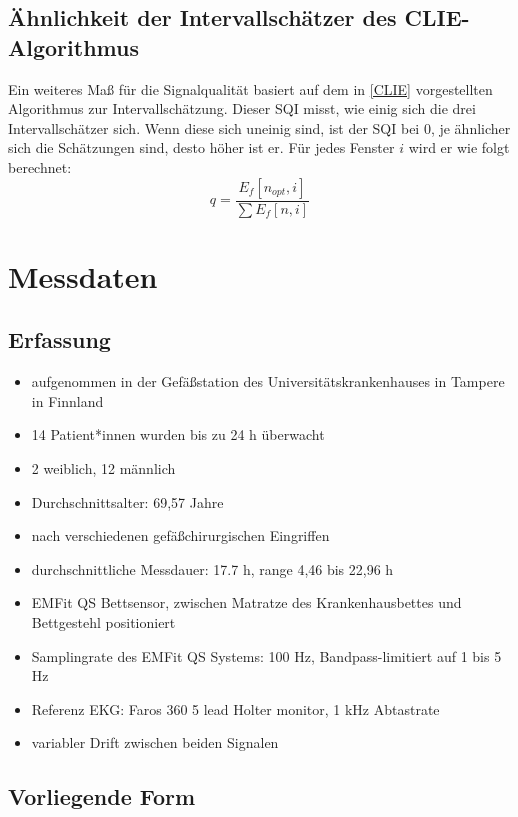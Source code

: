 	\subsection{Ähnlichkeit der Intervallschätzer des CLIE-Algorithmus}
	
	Ein weiteres Maß für die Signalqualität basiert auf dem in \ref{CLIE} vorgestellten Algorithmus zur Intervallschätzung. Dieser \acl{SQI} misst, wie einig sich die drei Intervallschätzer sich. Wenn diese sich uneinig sind, ist der \ac{SQI} bei 0, je ähnlicher sich die Schätzungen sind, desto höher ist er. Für jedes Fenster $i$ wird er wie folgt berechnet: \[ q = \frac{E_f[n_{opt}, i]}{\sum E_f[n, i]} \]
	

\section{Messdaten}
	
	\subsection{Erfassung}
	
	\begin{itemize}
		\item aufgenommen in der Gefäßstation des Universitätskrankenhauses in Tampere in Finnland
		\item 14 Patient*innen wurden bis zu 24 h überwacht
		\item 2 weiblich, 12 männlich
		\item Durchschnittsalter: 69,57 Jahre
		\item nach verschiedenen gefäßchirurgischen Eingriffen
		\item durchschnittliche Messdauer: 17.7 h, range 4,46 bis 22,96 h
		\item EMFit QS Bettsensor, zwischen Matratze des Krankenhausbettes und Bettgestehl positioniert
		\item Samplingrate des EMFit QS Systems: 100 Hz, Bandpass-limitiert auf 1 bis 5 Hz
		\item Referenz EKG: Faros 360 5 lead Holter monitor, 1 kHz Abtastrate
		\item variabler Drift zwischen beiden Signalen %
	\end{itemize}
	
	\subsection{Vorliegende Form}
	
